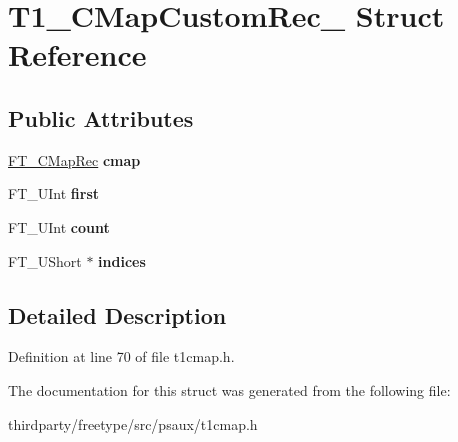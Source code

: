 \hypertarget{struct_t1___c_map_custom_rec__}{}\section{T1\+\_\+\+C\+Map\+Custom\+Rec\+\_\+ Struct Reference}
\label{struct_t1___c_map_custom_rec__}
\subsection*{Public Attributes}
\begin{DoxyCompactItemize}
\item 
\mbox{\label{struct_t1___c_map_custom_rec___a615069a7d312230c3cda8daa47191e9c}} 
\hyperlink{struct_f_t___c_map_rec__}{F\+T\+\_\+\+C\+Map\+Rec} {\bfseries cmap}
\item 
\mbox{\label{struct_t1___c_map_custom_rec___a5ad454413bf85a3df15122b58dbfcebc}} 
F\+T\+\_\+\+U\+Int {\bfseries first}
\item 
\mbox{\label{struct_t1___c_map_custom_rec___a9e00f7ba5271d4b312d97497c9920f1a}} 
F\+T\+\_\+\+U\+Int {\bfseries count}
\item 
\mbox{\label{struct_t1___c_map_custom_rec___aec1cee313d723bebae65f89358559ef6}} 
F\+T\+\_\+\+U\+Short $\ast$ {\bfseries indices}
\end{DoxyCompactItemize}


\subsection{Detailed Description}


Definition at line 70 of file t1cmap.\+h.



The documentation for this struct was generated from the following file\+:\begin{DoxyCompactItemize}
\item 
thirdparty/freetype/src/psaux/t1cmap.\+h\end{DoxyCompactItemize}
